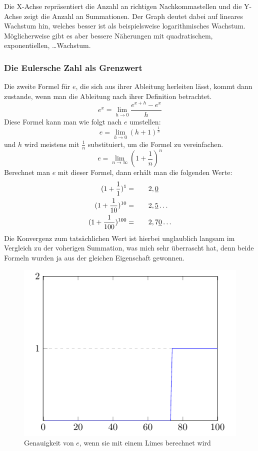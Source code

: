 \par Die X-Achse repräsentiert die Anzahl an richtigen Nachkommastellen und die Y-Achse zeigt die Anzahl an Summationen. Der Graph deutet dabei auf lineares Wachstum hin, welches besser ist als beispielsweise logarithmisches Wachstum. Möglicherweise gibt es aber bessere Näherungen mit quadratischem, exponentiellen, \dots Wachstum.
\subsubsection{Die Eulersche Zahl als Grenzwert}
Die zweite Formel für $e$, die sich aus ihrer Ableitung herleiten lässt, kommt dann zustande, wenn man die Ableitung nach ihrer Definition betrachtet. \[
e^x = \lim_{h\to0} \frac{e^{x+h}-e^x}{h}\]
Diese Formel kann man wie folgt nach $e$ umstellen:\[
e = \lim_{h\to0} (h + 1)^{\frac{1}{h}}\] 
und $h$ wird meistens mit $\frac{1}{n}$ substituiert, um die Formel zu vereinfachen.\[
e = \lim_{n\to\infty} (1+\frac{1}{n})^n\]
Berechnet man $e$ mit dieser Formel, dann erhält man die folgenden Werte: \[
  \begin{aligned}
  (1+\frac{1}{1})^1 = \indent\crel{2},\underline{0}\\
  (1+\frac{1}{10})^{10} =  \indent\crel{2},\underline{5}\dots\\
  (1+\frac{1}{100})^{100} = \indent\crel{2},7\underline{0}\dots
\end{aligned} \]
Die Konvergenz zum tatsächlichen Wert ist hierbei unglaublich langsam im Vergleich zu der voherigen Summation, was mich sehr überrascht hat, denn beide Formeln wurden ja aus der gleichen Eigenschaft gewonnen.
\begin{figure}[h]
  \includegraphics{medien2/limes/limes.pdf}
  \centering
  \caption{Genauigkeit von $e$, wenn sie mit einem Limes berechnet wird}
\end{figure}

